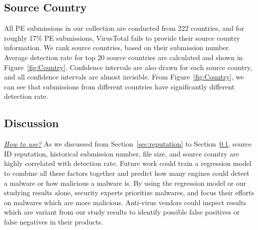 \subsection{Source Country}
\label{sec:country}


All PE submissions in our collection are conducted from 222 countries, 
and for roughly 17\% PE submissions, 
VirusTotal fails to provide their source country information. 
We rank source countries, based on their submission number. 
Average detection rate for top 20 source countries are calculated and shown in 
Figure~\ref{fig:Country}. 
Confidence intervals are also drawn for each source country, 
and all confidence intervals are almost invisible. 
From Figure~\ref{fig:Country}, 
we can see that submissions from different countries have significantly different detection rate.   

\subsection{Discussion}

{\textit{\underline{How to use?}}}
As we discussed from Section~\ref{sec:reputation} to Section~\ref{sec:country}, 
source ID reputation, historical submission number, file size, 
and source country are highly correlated with detection rate. 
Future work could train a regression model to combine all these factors together and 
predict how many engines could detect a malware or how malicious a malware is. 
By using the regression model or our studying results alone, 
security experts prioritize malwares, and focus their efforts on malwares which are more malicious. 
Anti-virus vendors could inspect results which are variant from our study results 
to identify possible false positives or false negatives in their products. 